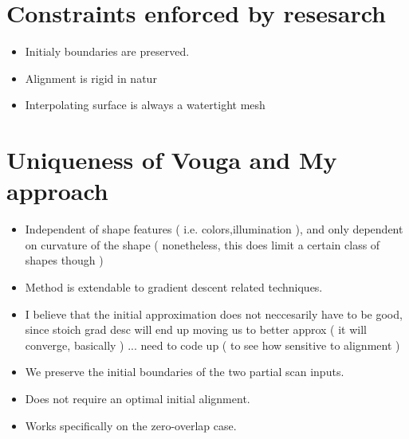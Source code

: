\documentclass{article}
\begin{document}
\section{Constraints enforced by resesarch}
\begin{itemize}
	\item Initialy boundaries are preserved.
	\item Alignment is rigid in natur
	\item Interpolating surface is always a watertight mesh
\end{itemize}

\section{Uniqueness of Vouga and My approach} 
\begin{itemize} 
\item Independent of shape features ( i.e. colors,illumination ), and only dependent on curvature of the shape ( nonetheless, this does limit a certain class of shapes though ) 
\item Method is extendable to gradient descent related techniques.  \item I believe that the initial approximation does not neccesarily have to be good, since stoich grad desc will end up moving us to better approx ( it will converge, basically ) ... need to code up ( to see how sensitive to alignment ) 
\item We preserve the initial boundaries of the two partial scan inputs. 
\item Does not require an optimal initial alignment.
\item Works specifically on the zero-overlap case.
\end{itemize} 

\end{document}
